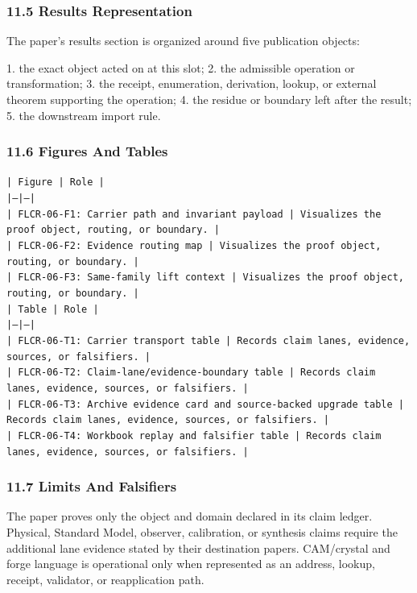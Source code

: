 \documentclass[11pt]{article}
\begin{document}
\subsubsection*{11.5 Results Representation}

The paper's results section is organized around five publication objects:

1. the exact object acted on at this slot;
2. the admissible operation or transformation;
3. the receipt, enumeration, derivation, lookup, or external theorem supporting
   the operation;
4. the residue or boundary left after the result;
5. the downstream import rule.

\subsubsection*{11.6 Figures And Tables}

\noindent\texttt{| Figure | Role |}\\
\noindent\texttt{|---|---|}\\
\noindent\texttt{| FLCR-06-F1: Carrier path and invariant payload | Visualizes the proof object, routing, or boundary. |}\\
\noindent\texttt{| FLCR-06-F2: Evidence routing map | Visualizes the proof object, routing, or boundary. |}\\
\noindent\texttt{| FLCR-06-F3: Same-family lift context | Visualizes the proof object, routing, or boundary. |}\\

\noindent\texttt{| Table | Role |}\\
\noindent\texttt{|---|---|}\\
\noindent\texttt{| FLCR-06-T1: Carrier transport table | Records claim lanes, evidence, sources, or falsifiers. |}\\
\noindent\texttt{| FLCR-06-T2: Claim-lane/evidence-boundary table | Records claim lanes, evidence, sources, or falsifiers. |}\\
\noindent\texttt{| FLCR-06-T3: Archive evidence card and source-backed upgrade table | Records claim lanes, evidence, sources, or falsifiers. |}\\
\noindent\texttt{| FLCR-06-T4: Workbook replay and falsifier table | Records claim lanes, evidence, sources, or falsifiers. |}\\

\subsubsection*{11.7 Limits And Falsifiers}

The paper proves only the object and domain declared in its claim ledger.
Physical, Standard Model, observer, calibration, or synthesis claims require
the additional lane evidence stated by their destination papers. CAM/crystal
and forge language is operational only when represented as an address, lookup,
receipt, validator, or reapplication path.
\end{document}
